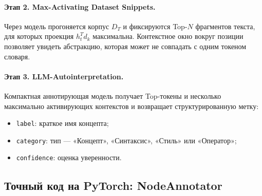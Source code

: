 \documentclass[11pt,a4paper]{article}
\begin{document}
\paragraph{Этап 2. Max-Activating Dataset Snippets.}
Через модель прогоняется корпус $D_T$ и фиксируются Top-$N$ фрагментов текста, для которых проекция $h_t^T d_k$ максимальна. Контекстное окно вокруг позиции позволяет увидеть абстракцию, которая может не совпадать с одним токеном словаря.

\paragraph{Этап 3. LLM-Autointerpretation.}
Компактная аннотирующая модель получает Top-токены и несколько максимально активирующих контекстов и возвращает структурированную метку:
\begin{itemize}
    \item \texttt{label}: краткое имя концепта;
    \item \texttt{category}: тип — «Концепт», «Синтаксис», «Стиль» или «Оператор»;
    \item \texttt{confidence}: оценка уверенности.
\end{itemize}

\iffalse
\subsection*{Точный код на PyTorch: NodeAnnotator}
\end{document}
